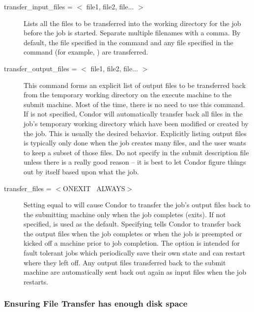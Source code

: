 \begin{description}

\item[transfer\_input\_files = $<$ file1, file2, file... $>$] 
Lists all the files to be transferred into the 
working directory for the job before the job is started.
Separate multiple filenames with a comma.
By default, the file specified in the
 command and any file specified in the 
command (for example, ) are transferred.

\item[transfer\_output\_files = $<$ file1, file2, file... $>$] This
command forms an explicit list of output files to be transferred
back from the
temporary working directory on the execute machine to the submit machine.
Most of the time, there is no need to use this command.
If  is not specified,
Condor will automatically transfer back all files in the job's
temporary working directory which have been
modified or created by the job.
This is usually the desired behavior.
Explicitly listing output files is typically only done when the job creates
many files, and the user wants to keep a subset of
those files. 
\Warn Do not specify  in the
submit description file unless there is a really good reason -- it is
best to let Condor figure things out by itself based upon what
the job.

\item[transfer\_files = $<$ONEXIT \Bar\ ALWAYS$>$] Setting
 equal to  will cause Condor to transfer the
job's output files back to the submitting machine only when the job
completes (exits).  If not specified,  is used as the default.
Specifying  tells Condor to transfer back the output files when
the job completes or when the job is preempted or kicked off
a machine prior to job completion.
The  option is intended
for fault tolerant jobs which periodically save their own state and
can restart where they left off.  Any output files transferred back to the
submit machine are automatically sent back
out again as input files when the job restarts.

\end{description}

\subsubsection{Ensuring File Transfer has enough disk space}

